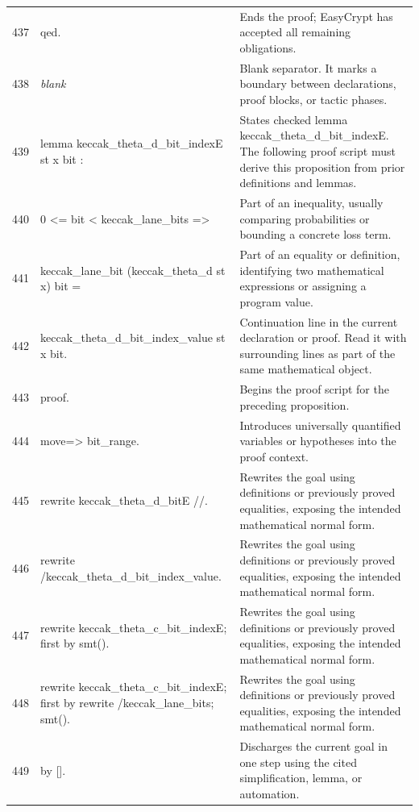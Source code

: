 \documentclass[10pt]{article}
\begin{document}
\begin{longtable}{r L{0.53\textwidth} L{0.37\textwidth}}
437 & {\ttfamily\scriptsize qed.} & Ends the proof; EasyCrypt has accepted all remaining obligations. \\
438 & {\ttfamily\scriptsize \emph{blank}} & Blank separator.  It marks a boundary between declarations, proof blocks, or tactic phases. \\
439 & {\ttfamily\scriptsize lemma keccak\_theta\_d\_bit\_indexE st x bit :} & States checked lemma keccak\_theta\_d\_bit\_indexE.  The following proof script must derive this proposition from prior definitions and lemmas. \\
440 & {\ttfamily\scriptsize   0 <= bit < keccak\_lane\_bits =>} & Part of an inequality, usually comparing probabilities or bounding a concrete loss term. \\
441 & {\ttfamily\scriptsize   keccak\_lane\_bit (keccak\_theta\_d st x) bit =} & Part of an equality or definition, identifying two mathematical expressions or assigning a program value. \\
442 & {\ttfamily\scriptsize   keccak\_theta\_d\_bit\_index\_value st x bit.} & Continuation line in the current declaration or proof.  Read it with surrounding lines as part of the same mathematical object. \\
443 & {\ttfamily\scriptsize proof.} & Begins the proof script for the preceding proposition. \\
444 & {\ttfamily\scriptsize move=> bit\_range.} & Introduces universally quantified variables or hypotheses into the proof context. \\
445 & {\ttfamily\scriptsize rewrite keccak\_theta\_d\_bitE //.} & Rewrites the goal using definitions or previously proved equalities, exposing the intended mathematical normal form. \\
446 & {\ttfamily\scriptsize rewrite /keccak\_theta\_d\_bit\_index\_value.} & Rewrites the goal using definitions or previously proved equalities, exposing the intended mathematical normal form. \\
447 & {\ttfamily\scriptsize rewrite keccak\_theta\_c\_bit\_indexE; first by smt().} & Rewrites the goal using definitions or previously proved equalities, exposing the intended mathematical normal form. \\
448 & {\ttfamily\scriptsize rewrite keccak\_theta\_c\_bit\_indexE; first by rewrite /keccak\_lane\_bits; smt().} & Rewrites the goal using definitions or previously proved equalities, exposing the intended mathematical normal form. \\
449 & {\ttfamily\scriptsize by [].} & Discharges the current goal in one step using the cited simplification, lemma, or automation. \\

\end{longtable}
\end{document}
